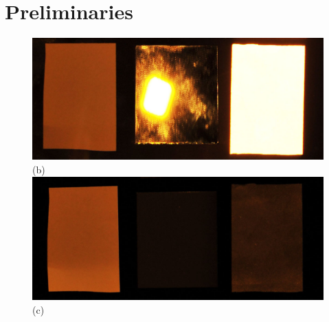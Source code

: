 \section{Preliminaries}
\label{sec:background}

\begin{figure}[tb]
     \hfill
\endminipage \hfill
{}
        \includegraphics[width=0.8\columnwidth]{fig/tx90-rx90.JPG} (b) \\
        \includegraphics[width=0.8\columnwidth]{fig/tx45-rx90.JPG} (c) \\

\end{figure}
